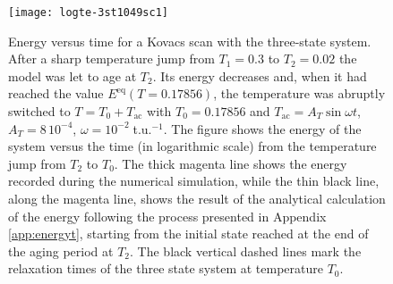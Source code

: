 \documentclass[pre,a4paper,twocolumn,superscriptaddress,%
floatfix]{revtex4}
\newcommand{\tac}{\ensuremath{T_{\mathrm{ac}}}}
\newcommand{\dtac}{\ensuremath{A_T}}
\begin{document}
\begin{figure}[h]
  \centering
  \texttt{[image: logte-3st1049sc1]}
  \caption{Energy versus time for a Kovacs scan with the three-state
    system. After a sharp temperature jump from $T_1=0.3$ to $T_2=0.02$ the
    model was let to age at $T_2$. Its energy decreases and, when it had
    reached the value $E^{\mathrm{eq}}(T=0.17856)$, the temperature was
    abruptly switched to $T = T_0 + \tac$ with $T_0=0.17856$ and
  $\tac = \dtac \sin \omega t$, $\dtac = 8\,10^{-4}$, $\omega =
  10^{-2}\;$t.u.$^{-1}$. The figure shows the energy of the system versus the
  time (in logarithmic scale) from the temperature jump from $T_2$ to $T_0$.
The thick magenta line shows the energy recorded during the numerical
simulation, while the thin black line, along the magenta line, shows the
result of the analytical calculation of the energy following the process
presented in Appendix \ref{app:energyt}, starting from the initial state
reached at the end of the aging period at $T_2$. The black vertical dashed
lines mark the relaxation times of the three state system at temperature
$T_0$.} 
  \label{fig:ekovacs}
\end{figure}
\end{document}
